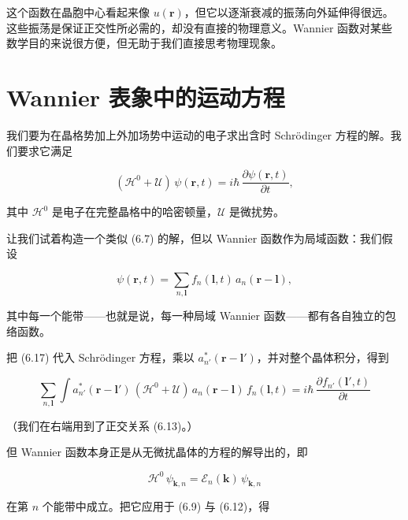 这个函数在晶胞中心看起来像 $u(\mathbf{r})$，但它以逐渐衰减的振荡向外延伸得很远。这些振荡是保证正交性所必需的，却没有直接的物理意义。Wannier 函数对某些数学目的来说很方便，但无助于我们直接思考物理现象。

\section{Wannier 表象中的运动方程}

我们要为在晶格势加上外加场势中运动的电子求出含时 Schrödinger 方程的解。我们要求它满足

\begin{equation*}
(\mathcal{H}^0 + \mathcal{U})\,\psi(\mathbf{r},t) = i\hbar\,\frac{\partial\psi(\mathbf{r},t)}{\partial t},
\tag{6.16}
\end{equation*}

其中 $\mathcal{H}^0$ 是电子在完整晶格中的哈密顿量，$\mathcal{U}$ 是微扰势。

让我们试着构造一个类似 (6.7) 的解，但以 Wannier 函数作为局域函数：我们假设

\begin{equation*}
\psi(\mathbf{r},t) = \sum_{n,\boldsymbol{l}} f_n(\boldsymbol{l},t)\,a_n(\mathbf{r}-\boldsymbol{l}),
\tag{6.17}
\end{equation*}

其中每一个能带——也就是说，每一种局域 Wannier 函数——都有各自独立的包络函数。

把 (6.17) 代入 Schrödinger 方程，乘以 $a_{n'}^{*}(\mathbf{r}-\boldsymbol{l}')$，并对整个晶体积分，得到

\begin{equation*}
\sum_{n,\boldsymbol{l}} \int a_{n'}^{*}(\mathbf{r}-\boldsymbol{l}')\,(\mathcal{H}^0 + \mathcal{U})\,a_n(\mathbf{r}-\boldsymbol{l})\,f_n(\boldsymbol{l},t) = i\hbar\,\frac{\partial f_{n'}(\boldsymbol{l}',t)}{\partial t}
\tag{6.18}
\end{equation*}

（我们在右端用到了正交关系 (6.13)。）

但 Wannier 函数本身正是从无微扰晶体的方程的解导出的，即

\begin{equation*}
\mathcal{H}^0\,\psi_{\mathbf{k},n} = \mathcal{E}_n(\mathbf{k})\,\psi_{\mathbf{k},n}
\tag{6.19}
\end{equation*}

在第 $n$ 个能带中成立。把它应用于 (6.9) 与 (6.12)，得


